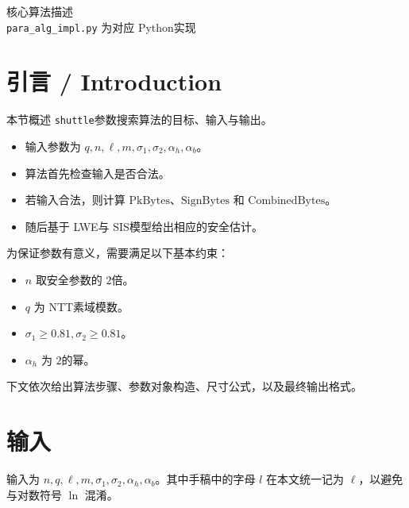 \documentclass[11pt]{article}
\newcommand{\zh}[1]{{\zhfont #1}}
\begin{document}
\begin{center}
{\LARGE \zh{核心算法描述}}\\[0.4em]
{\small \texttt{para\_alg\_impl.py} {\zhfont 为对应 }Python{\zhfont 实现}}
\end{center}

\section*{\zh{引言} / Introduction}

{\zhfont 本节概述 }\texttt{shuttle}{\zhfont 参数搜索算法的目标、输入与输出。}

\begin{itemize}
  \item {\zhfont 输入参数为 }$q,n,\ell,m,\sigma_1,\sigma_2,\alpha_h,\alpha_b${\zhfont 。}
  \item {\zhfont 算法首先检查输入是否合法。}
  \item {\zhfont 若输入合法，则计算 }$\mathrm{PkBytes}${\zhfont 、}$\mathrm{SignBytes}$ {\zhfont 和 }$\mathrm{CombinedBytes}${\zhfont 。}
  \item {\zhfont 随后基于 }LWE{\zhfont 与 }SIS{\zhfont 模型给出相应的安全估计。}
\end{itemize}

{\zhfont 为保证参数有意义，需要满足以下基本约束：}

\begin{itemize}
  \item $n$ {\zhfont 取安全参数的 }$2${\zhfont 倍。}
  \item $q$ {\zhfont 为 }NTT{\zhfont 素域模数。}
  \item $\sigma_1 \ge 0.81,\sigma_2 \ge 0.81${\zhfont 。}
  \item $\alpha_h$ {\zhfont 为 }$2${\zhfont 的幂。}
\end{itemize}

{\zhfont 下文依次给出算法步骤、参数对象构造、尺寸公式，以及最终输出格式。}


\section*{\zh{输入}}
{\zhfont 输入为 $n,q,\ell,m,\sigma_1,\sigma_2,\alpha_h,\alpha_b$。其中手稿中的字母 $l$ 在本文统一记为 $\ell$，以避免与对数符号 $\ln$ 混淆。}
\end{document}
